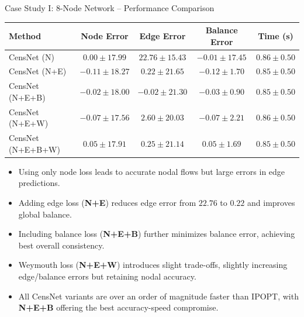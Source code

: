 \documentclass[hyperref={colorlinks,citecolor=blue,linkcolor=blue,urlcolor=blue}]{beamer}
\begin{document}
\begin{frame}{Case Study I: 8-Node Network -- Performance Comparison}
\justifying
\scriptsize
\begin{table}
\captionsetup{font=scriptsize}  %
\hfill  %
\begin{tabular}{lcccc}
\toprule
\textbf{Method} & \textbf{Node Error} & \textbf{Edge Error} & \textbf{Balance Error} & \textbf{Time (s)} \\
\midrule
CensNet (N) & $0.00 \pm 17.99$ & $22.76 \pm 15.43$ & $-0.01 \pm 17.45$ & $0.86 \pm 0.50$ \\
CensNet (N+E) & $-0.11 \pm 18.27$ & $0.22 \pm 21.65$ & $-0.12 \pm 1.70$ & $0.85 \pm 0.50$ \\
CensNet (N+E+B) & $-0.02 \pm 18.00$ & $-0.02 \pm 21.30$ & $-0.03 \pm 0.90$ & $0.85 \pm 0.50$ \\
CensNet (N+E+W) & $-0.07 \pm 17.56$ & $2.60 \pm 20.03$ & $-0.07 \pm 2.21$ & $0.86 \pm 0.50$ \\
CensNet (N+E+B+W) & $0.05 \pm 17.91$ & $0.25 \pm 21.14$ & $0.05 \pm 1.69$ & $0.85 \pm 0.50$ \\
\bottomrule
\end{tabular}
\end{table}

\begin{itemize}
    \item Using only node loss leads to accurate nodal flows but large errors in edge predictions.
    \item Adding edge loss (\textbf{N+E}) reduces edge error from $22.76$ to $0.22$ and improves global balance.
    \item Including balance loss (\textbf{N+E+B}) further minimizes balance error, achieving best overall consistency.
    \item Weymouth loss (\textbf{N+E+W}) introduces slight trade-offs, slightly increasing edge/balance errors but retaining nodal accuracy.
    \item All CensNet variants are over an order of magnitude faster than IPOPT, with \textbf{N+E+B} offering the best accuracy-speed compromise.
\end{itemize}

\end{frame}
\end{document}
